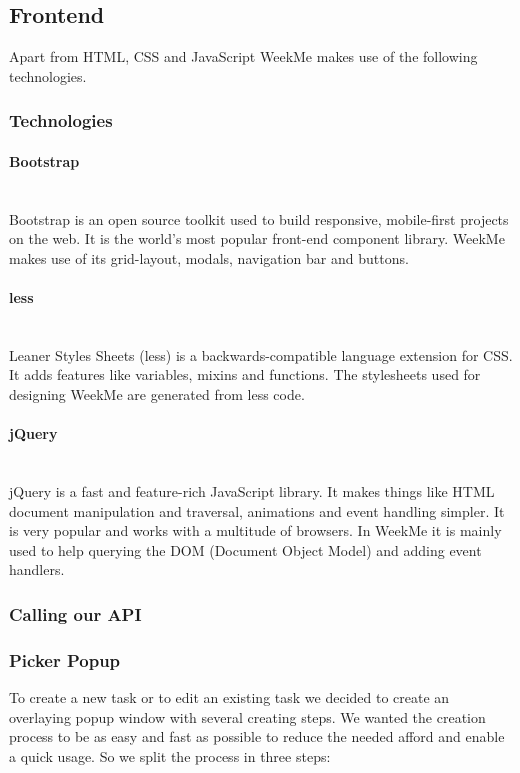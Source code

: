 \subsection{Frontend}
Apart from HTML, CSS and JavaScript WeekMe makes use of the following technologies. 
\subsubsection{Technologies}
\paragraph{Bootstrap}\mbox{}\\
Bootstrap is an open source toolkit used to build responsive, mobile-first projects on the web. 
It is the world’s most popular front-end component library. WeekMe makes use of its grid-layout, modals, navigation bar and buttons.
\cite{bootstrap}

\paragraph{less}\mbox{}\\
Leaner Styles Sheets (less) is a backwards-compatible language extension for CSS. It adds features like variables, mixins and functions.
\cite{less}
The stylesheets used for designing WeekMe are generated from less code. 

\paragraph{jQuery}\mbox{}\\
jQuery is a fast and feature-rich JavaScript library. It makes things like HTML document manipulation and traversal, animations and event handling simpler. It is very popular and works with a multitude of browsers.
\cite{jquery}
In WeekMe it is mainly used to help querying the DOM (Document Object Model) and adding event handlers. 

\subsubsection{Calling our API}

\subsubsection{Picker Popup}

To create a new task or to edit an existing task we decided to create an overlaying popup window with several creating steps.
We wanted the creation process to be as easy and fast as possible to reduce the needed afford and enable a quick usage.
So we split the process in three steps:

